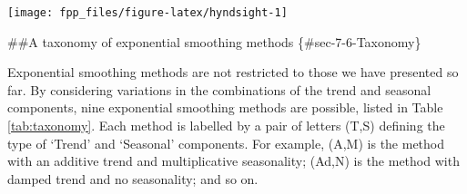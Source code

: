 \documentclass[]{book}
\begin{document}
\begin{center}\texttt{[image: fpp\_files/figure-latex/hyndsight-1]} \end{center}

\#\#A taxonomy of exponential smoothing methods \{\#sec-7-6-Taxonomy\}

Exponential smoothing methods are not restricted to those we have presented so far. By considering variations in the combinations of the trend and seasonal components, nine exponential smoothing methods are possible, listed in Table \ref{tab:taxonomy}. Each method is labelled by a pair of letters (T,S) defining the type of `Trend' and `Seasonal' components. For example, (A,M) is the method with an additive trend and multiplicative seasonality; (Ad,N) is the method with damped trend and no seasonality; and so on.
\end{document}
